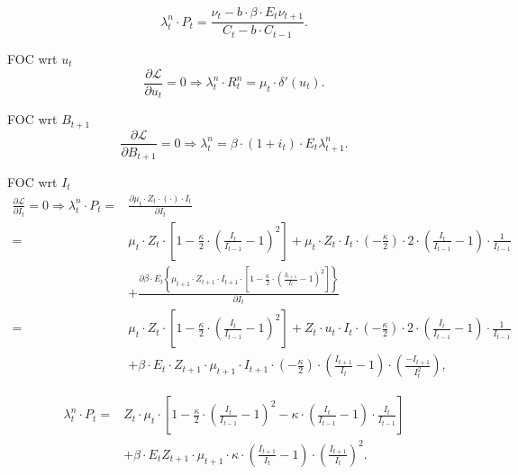 \begin{equation}
\label{eq:MS-HH-FOC-C}
\lambda^n_t \cdot P_t = \frac{\nu_t - b \cdot \beta \cdot E_t \nu_{t+1}}{C_t - b \cdot C_{t-1}}.
\end{equation}

FOC wrt $u_t$
\begin{equation}
\label{eq:MS-HH-FOC-u}
\frac{\partial \mathcal{L}}{\partial u_t} = 0 \Rightarrow \lambda^n_t \cdot R^n_t = \mu_t \cdot \delta'(u_t) .
\end{equation}

FOC wrt $B_{t+1}$
\begin{equation}
\label{eq:MS-HH-FOC-B}
\frac{\partial \mathcal{L}}{\partial B_{t+1}} = 0 \Rightarrow \lambda^n_t = \beta \cdot (1+i_t) \cdot E_t \lambda^n_{t+1}.
\end{equation}

FOC wrt $I_t$
\begin{align*}
\frac{\partial \mathcal{L}}{\partial I_t} = 0 \Rightarrow \lambda^n_t \cdot P_t  =& \frac{\partial \mu_t \cdot Z_t \cdot \left(\cdot \right) \cdot I_t}{\partial I_t}\\
=& \mu_t \cdot Z_t \cdot \left[1-\frac{\kappa}{2} \cdot \left(\frac{I_t}{I_{t-1}} - 1 \right)^2\right] + \mu_t \cdot Z_t \cdot  I_t \cdot (-\frac{\kappa}{2}) \cdot 2 \cdot \left(\frac{I_t}{I_{t-1}} -1\right) \cdot \frac{1}{I_{t-1}} \\
&+ \frac{\partial \beta \cdot E_t \left\{ \mu_{t+1} \cdot Z_{t+1}   \cdot I_{t+1} \cdot \left[1 - \frac{\kappa}{2} \cdot \left(\frac{I_{t+1}}{I_{t}} -1\right)^2 \right] \right\}}{\partial I_t} \\
=& \mu_t \cdot Z_t \cdot \left[1-\frac{\kappa}{2} \cdot \left(\frac{I_t}{I_{t-1}} - 1 \right)^2\right] + Z_t \cdot u_t \cdot I_t \cdot (-\frac{\kappa}{2}) \cdot 2 \cdot \left(\frac{I_t}{I_{t-1}} -1\right) \cdot \frac{1}{I_{t-1}} \\
&+ \beta \cdot E_t \cdot Z_{t+1} \cdot \mu_{t+1} \cdot I_{t+1} \cdot \left(-\frac{\kappa}{2}\right) \cdot \left(\frac{I_{t+1}}{I_t}-1\right) \cdot \left(\frac{- I_{t+1}}{I_t^2}\right),
\end{align*}

\begin{equation}
\label{eq:MS-HH-FOC-I}
\begin{split}
\lambda^n_t \cdot P_t =& Z_t \cdot \mu_t \cdot \left[
  1 - \frac{\kappa}{2} \cdot \left(\frac{I_t}{I_{t-1}} -1\right)^2 - \kappa \cdot \left(\frac{I_t}{I_{t-1}} -1\right) \cdot \frac{I_t}{I_{t-1}}
\right] \\
&+ \beta \cdot E_t Z_{t+1} \cdot \mu_{t+1} \cdot \kappa \cdot \left(\frac{I_{t+1}}{I_{t}} -1\right) \cdot \left(\frac{I_{t+1}}{I_{t}} \right)^2.
\end{split}
\end{equation}

